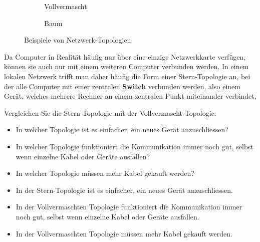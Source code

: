 \begin{figure}[H]
\begin{subfigure}[b]{0.25\textwidth}
		\caption{Vollvermascht}
	\end{subfigure}
	\begin{subfigure}{.25\textwidth}
		\centering
		\caption{Baum}
	\end{subfigure}
	\caption{Beispiele von Netzwerk-Topologien}
	\label{fig:topologie}
\end{figure}

Da Computer in Realität häufig nur über eine einzige Netzwerkkarte verfügen, können sie auch nur mit einem weiteren Computer verbunden werden. In einem lokalen Netzwerk trifft man daher häufig die Form einer Stern-Topologie an, bei der alle Computer mit einer zentralen \textbf{Switch} verbunden werden, also einem Gerät, welches mehrere Rechner an einem zentralen Punkt miteinander verbindet.

\begin{myexercise}
	Vergleichen Sie die Stern-Topologie mit der Vollvermascht-Topologie:
	\begin{itemize}
		\item In welcher Topologie ist es einfacher, ein neues Gerät anzuschliessen?
		\item In welcher Topologie funktioniert die Kommunikation immer noch gut, selbst wenn einzelne Kabel oder Geräte ausfallen?
		\item In welcher Topologie müssen mehr Kabel gekauft werden?
	\end{itemize}
	\begin{myanswer}
		\begin{itemize}
			\item In der Stern-Topologie ist es einfacher, ein neues Gerät anzuschliessen.
			\item In der Vollvermaschten Topologie funktioniert die Kommunikation immer noch gut, selbst wenn einzelne Kabel oder Geräte ausfallen.
			\item In der Vollvermaschten Topologie müssen mehr Kabel gekauft werden.
		\end{itemize}
	\end{myanswer}
\end{myexercise}

